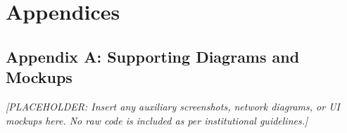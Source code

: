 \chapter{Appendices}

\section{Appendix A: Supporting Diagrams and Mockups}
\textit{[PLACEHOLDER: Insert any auxiliary screenshots, network diagrams, or UI mockups here. No raw code is included as per institutional guidelines.]}
